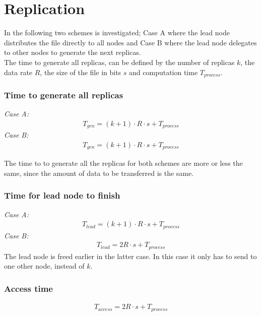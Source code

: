 \section{Replication} \label{sec:repl}
In the following two schemes is investigated; Case A where the lead node distributes the file directly to all nodes and Case B where the lead node delegates to other nodes to generate the next replicas. \\
The time to generate all replicas, can be defined by the number of replicas $k$, the data rate $R$, the size of the file in bits $s$ and computation time $T_{process}$. 

\subsubsection*{Time to generate all replicas}
\textit{Case A:} 
\begin{align} 
    T_{gen} = (k+1)\cdot R\cdot s + T_{process} \label{eq:e2_rep_A}
\end{align}
\textit{Case B:} 
\begin{align}
    T_{gen} = (k+1)\cdot R\cdot s + T_{process} \label{eq:e2_rep_B}
\end{align}

The time to to generate all the replicas for both schemes are more or less the same, since the amount of data to be transferred is the same. 

\subsubsection*{Time for lead node to finish}
\textit{Case A:}
\begin{align} 
    T_{lead} = (k+1)\cdot R\cdot s + T_{process} \label{eq:e2_lead_A}
\end{align}
\textit{Case B:}
\begin{align} 
    T_{lead} = 2R \cdot s + T_{process} \label{eq:e2_lead_B}
\end{align}
The lead node is freed earlier in the latter case. In this case it only has to send to one other node, instead of $k$.

\subsubsection*{Access time}
\begin{align}
    T_{access} = 2R \cdot s + T_{process}
\end{align}


